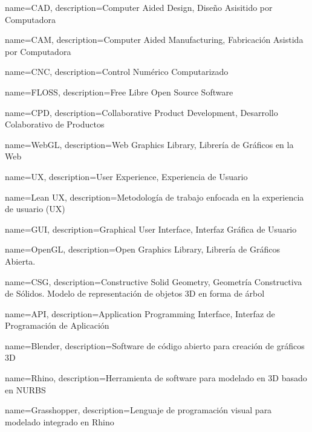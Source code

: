{
    name=CAD,
    description={Computer Aided Design, Diseño Asisitido por Computadora}
}

{
    name=CAM,
    description={Computer Aided Manufacturing, Fabricación Asistida por Computadora}
}

{
    name=CNC,
    description={Control Numérico Computarizado}
}

{
    name=FLOSS,
    description={Free Libre Open Source Software}
}

{
    name=CPD,
    description={Collaborative  Product  Development, Desarrollo Colaborativo de Productos}
}


{
    name=WebGL,
    description={Web Graphics Library, Librería de Gráficos en la Web}
}

{
    name=UX,
    description={User Experience, Experiencia de Usuario}
}

{
    name=Lean UX,
    description={Metodología de trabajo enfocada en la  experiencia de usuario (UX)}
}

{
    name=GUI,
    description={Graphical User Interface, Interfaz Gráfica de Usuario}
}

{
    name=OpenGL,
    description={Open Graphics Library, Librería de Gráficos Abierta.}
}

{
    name=CSG,
    description={Constructive Solid Geometry, Geometría Constructiva de Sólidos. Modelo de representación de objetos 3D en forma de árbol}
}

{
    name=API,
    description={Application Programming Interface, Interfaz de Programación de Aplicación}
}

{
    name=Blender,
    description={Software de código abierto para creación de gráficos 3D}
}

{
    name=Rhino,
    description={Herramienta de software para modelado en 3D basado en NURBS}
}


{
    name=Grasshopper,
    description={Lenguaje de programación visual para modelado integrado en Rhino}
}

